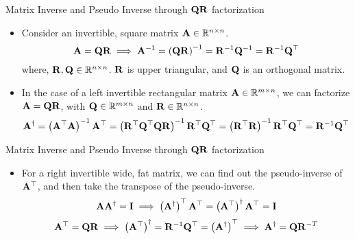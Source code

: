 \documentclass[aspectratio=169]{beamer}
\let\olditem\item
\renewcommand{\item}{\setlength{\itemsep}{\fill}\olditem}
\def\mf{\ensuremath\mathbf}
\def\mb{\ensuremath\mathbb}
\begin{document}


\begin{frame}[t]{Matrix Inverse and Pseudo Inverse through $\mf{QR}$ factorization}
\begin{itemize}
    \item Consider an invertible, square matrix $\mf{A} \in \mb{R}^{n \times n}$. 
    \[ \mf{A} = \mf{QR} \implies \mf{A}^{-1} = \left(\mf{QR}\right)^{-1} = \mf{R}^{-1}\mf{Q}^{-1} = \mf{R}^{-1}\mf{Q}^\top \] 
    where, $\mf{R}, \mf{Q} \in \mb{R}^{n \times n}$. $\mf{R}$ is upper triangular, and $\mf{Q}$ is an orthogonal matrix.
    
    \item In the case of a left invertible rectangular matrix $\mf{A} \in \mb{R}^{m \times n}$, we can factorize $\mf{A} = \mf{QR}$, with $\mf{Q} \in \mb{R}^{m \times n}$ and $\mf{R} \in \mb{R}^{n \times n}$.
    \[ \mf{A}^{\dagger} = \left(\mf{A}^\top\mf{A}\right)^{-1}\mf{A}^\top = \left(\mf{R}^\top\mf{Q}^\top\mf{QR}\right)^{-1}\mf{R}^\top\mf{Q}^\top = \left(\mf{R}^\top\mf{R}\right)^{-1}\mf{R}^\top\mf{Q}^\top = \mf{R}^{-1}\mf{Q}^\top \]
\end{itemize}
\end{frame}


\begin{frame}[t]{Matrix Inverse and Pseudo Inverse through $\mf{QR}$ factorization}
\begin{itemize}
    \item For a right invertible wide, fat matrix, we can find out the pseudo-inverse of $\mf{A}^\top$, and then take the transpose of the pseudo-inverse.
    \[ \mf{AA}^{\dagger} = \mf{I} \implies \left(\mf{A}^{\dagger}\right)^\top\mf{A}^\top = \left(\mf{A}^\top\right)^{\dagger}\mf{A}^\top = \mf{I} \]
    \[ \mf{A}^\top = \mf{QR} \implies \left(\mf{A}^\top\right)^{\dagger} = \mf{R}^{-1}\mf{Q}^\top = \left(\mf{A}^{\dagger}\right)^\top \implies  \mf{A}^{\dagger} = \mf{QR}^{-T} \]
\end{itemize}
\end{frame}
\end{document}
